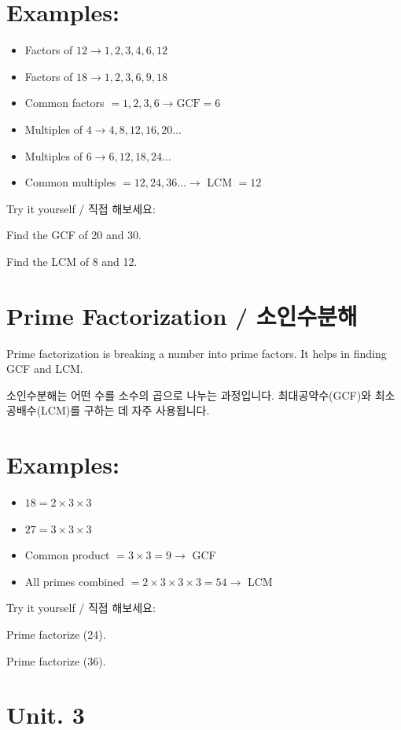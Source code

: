 \documentclass[10pt]{article}
\begin{document}
\section*{Examples:}
\begin{itemize}
  \item Factors of $12 \rightarrow 1,2,3,4,6,12$
  \item Factors of $18 \rightarrow 1,2,3,6,9,18$
  \item Common factors $=1,2,3,6 \rightarrow \mathrm{GCF}=6$
  \item Multiples of $4 \rightarrow 4,8,12,16,20 \ldots$
  \item Multiples of $6 \rightarrow 6,12,18,24 \ldots$
  \item Common multiples $=12,24,36 \ldots \rightarrow$ LCM $=12$
\end{itemize}

Try it yourself / 직접 해보세요:

Find the GCF of 20 and 30.

Find the LCM of 8 and 12.

\section*{Prime Factorization / 소인수분해}
Prime factorization is breaking a number into prime factors. It helps in finding GCF and LCM.

소인수분해는 어떤 수를 소수의 곱으로 나누는 과정입니다. 최대공약수(GCF)와 최소공배수(LCM)를 구하는 데 자주 사용됩니다.

\section*{Examples:}
\begin{itemize}
  \item $18=2 \times 3 \times 3$
  \item $27=3 \times 3 \times 3$
  \item Common product $=3 \times 3=9 \rightarrow$ GCF
  \item All primes combined $=2 \times 3 \times 3 \times 3=54 \rightarrow$ LCM
\end{itemize}

Try it yourself / 직접 해보세요:

Prime factorize (24).

Prime factorize (36).

\section*{Unit. 3}
\end{document}
